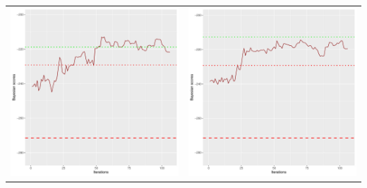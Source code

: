 \documentclass[]{scrartcl}
\begin{document}
\begin{table}[h!]
\begin{tabular}{cc}
\includegraphics[scale = 0.4]{./figs/asia/v5/10/bayBoundsEvolution-107.pdf} & 
\includegraphics[scale = 0.4]{./figs/asia/v5/20/bayBoundsEvolution-107.pdf} \\

\end{tabular}
\end{table}
\end{document}
